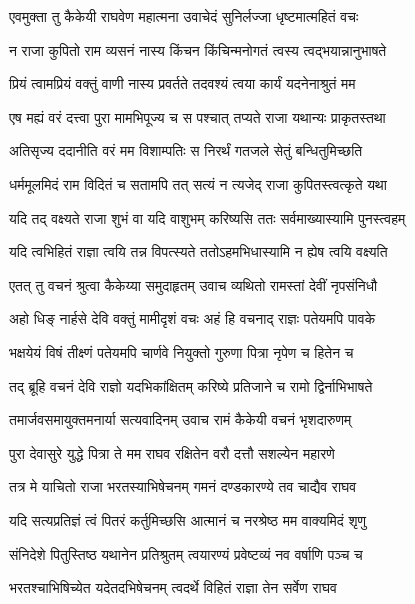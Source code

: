 \twolineshloka
{एवमुक्ता तु कैकेयी राघवेण महात्मना}
{उवाचेदं सुनिर्लज्जा धृष्टमात्महितं वचः} %

\twolineshloka
{न राजा कुपितो राम व्यसनं नास्य किंचन}
{किंचिन्मनोगतं त्वस्य त्वद्भयान्नानुभाषते} %

\twolineshloka
{प्रियं त्वामप्रियं वक्तुं वाणी नास्य प्रवर्तते}
{तदवश्यं त्वया कार्यं यदनेनाश्रुतं मम} %

\twolineshloka
{एष मह्यं वरं दत्त्वा पुरा मामभिपूज्य च}
{स पश्चात् तप्यते राजा यथान्यः प्राकृतस्तथा} %

\twolineshloka
{अतिसृज्य ददानीति वरं मम विशाम्पतिः}
{स निरर्थं गतजले सेतुं बन्धितुमिच्छति} %

\twolineshloka
{धर्ममूलमिदं राम विदितं च सतामपि}
{तत् सत्यं न त्यजेद् राजा कुपितस्त्वत्कृते यथा} %

\twolineshloka
{यदि तद् वक्ष्यते राजा शुभं वा यदि वाशुभम्}
{करिष्यसि ततः सर्वमाख्यास्यामि पुनस्त्वहम्} %

\twolineshloka
{यदि त्वभिहितं राज्ञा त्वयि तन्न विपत्स्यते}
{ततोऽहमभिधास्यामि न ह्येष त्वयि वक्ष्यति} %

\twolineshloka
{एतत् तु वचनं श्रुत्वा कैकेय्या समुदाहृतम्}
{उवाच व्यथितो रामस्तां देवीं नृपसंनिधौ} %

\twolineshloka
{अहो धिङ् नार्हसे देवि वक्तुं मामीदृशं वचः}
{अहं हि वचनाद् राज्ञः पतेयमपि पावके} %

\twolineshloka
{भक्षयेयं विषं तीक्ष्णं पतेयमपि चार्णवे}
{नियुक्तो गुरुणा पित्रा नृपेण च हितेन च} %

\twolineshloka
{तद् ब्रूहि वचनं देवि राज्ञो यदभिकांक्षितम्}
{करिष्ये प्रतिजाने च रामो द्विर्नाभिभाषते} %

\twolineshloka
{तमार्जवसमायुक्तमनार्या सत्यवादिनम्}
{उवाच रामं कैकेयी वचनं भृशदारुणम्} %

\twolineshloka
{पुरा देवासुरे युद्धे पित्रा ते मम राघव}
{रक्षितेन वरौ दत्तौ सशल्येन महारणे} %

\twolineshloka
{तत्र मे याचितो राजा भरतस्याभिषेचनम्}
{गमनं दण्डकारण्ये तव चाद्यैव राघव} %

\twolineshloka
{यदि सत्यप्रतिज्ञं त्वं पितरं कर्तुमिच्छसि}
{आत्मानं च नरश्रेष्ठ मम वाक्यमिदं शृणु} %

\twolineshloka
{संनिदेशे पितुस्तिष्ठ यथानेन प्रतिश्रुतम्}
{त्वयारण्यं प्रवेष्टव्यं नव वर्षाणि पञ्च च} %

\twolineshloka
{भरतश्चाभिषिच्येत यदेतदभिषेचनम्}
{त्वदर्थे विहितं राज्ञा तेन सर्वेण राघव} %

